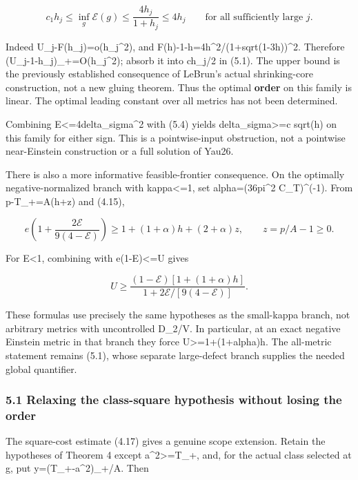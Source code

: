 \documentclass[
  10pt,
]{article}
\begin{document}
\[
 \boxed{c_1h_j\le\inf_g\mathcal E(g)
                   \le\frac{4h_j}{1+h_j}\le4h_j}
                  \qquad\text{for all sufficiently large }j. \tag{5.4}
\]

Indeed U\_j-F(h\_j)=o(h\_j\^{}2), and
F(h)-1-h=4h\^{}2/(1+sqrt(1-3h))\^{}2. Therefore
(U\_j-1-h\_j)\_+=O(h\_j\^{}2); absorb it into ch\_j/2 in (5.1). The
upper bound is the previously established consequence of LeBrun's actual
shrinking-core construction, not a new gluing theorem. Thus the optimal
\textbf{order} on this family is linear. The optimal leading constant
over all metrics has not been determined.

Combining E\textless=4delta\_sigma\^{}2 with (5.4) yields
delta\_sigma\textgreater=c sqrt(h) on this family for either sign. This
is a pointwise-input obstruction, not a pointwise near-Einstein
construction or a full solution of Yau26.

There is also a more informative feasible-frontier consequence. On the
optimally negative-normalized branch with kappa\textless=1, set
alpha=(36pi\^{}2 C\_T)\^{}(-1). From p-T\_+=A(h+z) and (4.15),

\[
 e\left(1+\frac{2\mathcal E}{9(4-\mathcal E)}\right)
 \ge 1+(1+\alpha)h+(2+\alpha)z,\qquad z=p/A-1\ge0.
                                                               \tag{5.5}
\]

For E\textless1, combining with e(1-E)\textless=U gives

\[
 U\ge\frac{(1-\mathcal E)[1+(1+\alpha)h]}
                 {1+2\mathcal E/[9(4-\mathcal E)]}.  \tag{5.6}
\]

These formulas use precisely the same hypotheses as the small-kappa
branch, not arbitrary metrics with uncontrolled D\_2/V. In particular,
at an exact negative Einstein metric in that branch they force
U\textgreater=1+(1+alpha)h. The all-metric statement remains (5.1),
whose separate large-defect branch supplies the needed global
quantifier.

\hypertarget{relaxing-the-class-square-hypothesis-without-losing-the-order}{%
\subsubsection{5.1 Relaxing the class-square hypothesis without losing
the
order}\label{relaxing-the-class-square-hypothesis-without-losing-the-order}}

The square-cost estimate (4.17) gives a genuine scope extension. Retain
the hypotheses of Theorem 4 except a\^{}2\textgreater=T\_+, and, for the
actual class selected at g, put y=(T\_+-a\^{}2)\_+/A. Then
\end{document}

